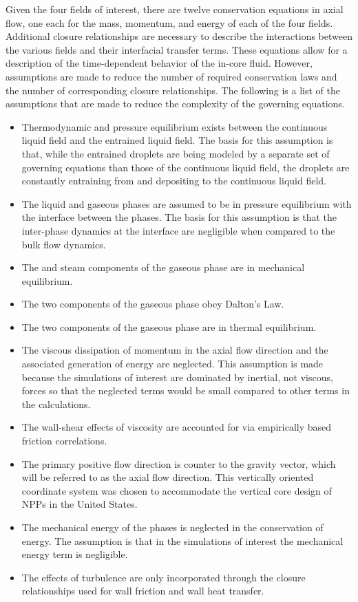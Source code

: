 Given the four fields of interest, there are twelve conservation equations in axial flow, one each for the mass, momentum, and energy of each of the four fields.
Additional closure relationships are necessary to describe the interactions between the various fields and their interfacial transfer terms.
These equations allow for a description of the time-dependent behavior of the in-core fluid.
However, assumptions are made to reduce the number of required conservation laws and the number of corresponding closure relationships.
The following is a list of the assumptions that are made to reduce the complexity of the governing equations.

\begin{itemize}
\item{
Thermodynamic and pressure equilibrium exists between the continuous liquid field and the entrained liquid field.
The basis for this assumption is that, while the entrained droplets are being modeled by a separate set of governing equations than those of the continuous liquid field, the droplets are constantly entraining from and depositing to the continuous liquid field. 
}
\item{
The liquid and gaseous phases are assumed to be in pressure equilibrium with the interface between the phases.
The basis for this assumption is that the inter-phase dynamics at the interface are negligible when compared to the bulk flow dynamics.
}
\item{The \ncg{} and steam components of the gaseous phase are in mechanical equilibrium.}
\item{The two components of the gaseous phase obey Dalton's Law.}
\item{The two components of the gaseous phase are in thermal equilibrium.}
\item{
The viscous dissipation of momentum in the axial flow direction and the associated generation of energy are neglected.
This assumption is made because the simulations of interest are dominated by inertial, not viscous, forces so that the neglected terms would be small compared to other terms in the calculations.
}
\item{
The wall-shear effects of viscosity are accounted for via empirically based friction correlations.
}
\item{
The primary positive flow direction is counter to the gravity vector, which will be referred to as the axial flow direction. This vertically oriented coordinate system was chosen to accommodate the vertical core design of NPPs in the United States.}
\item{
The mechanical energy of the phases is neglected in the conservation of energy. 
The assumption is that in the simulations of interest the mechanical energy term is negligible.
}
\item{
The effects of turbulence are only incorporated through the closure relationships used for wall friction and wall heat transfer.
}
\end{itemize}


